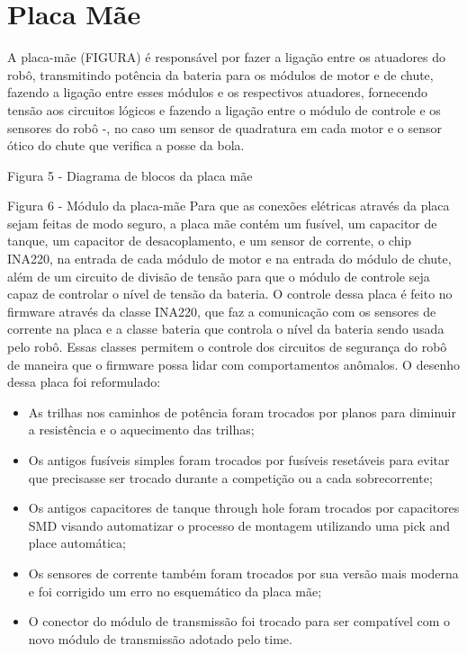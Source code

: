 \section{Placa Mãe}\label{sec:placa_mae}

A placa-mãe (FIGURA) é responsável por fazer a ligação entre os atuadores do robô, transmitindo potência da bateria para os módulos de motor e de chute, fazendo a ligação entre esses módulos e os respectivos atuadores, fornecendo tensão aos circuitos lógicos e fazendo a ligação entre o módulo de controle e os sensores do robô -, no caso um sensor de quadratura em cada motor e o sensor ótico do chute que verifica a posse da bola. 

Figura 5 - Diagrama de blocos da placa mãe

Figura 6 - Módulo da placa-mãe
Para que as conexões elétricas através da placa sejam feitas de modo seguro, a placa mãe contém um fusível, um capacitor de tanque, um capacitor de desacoplamento, e um sensor de corrente, o chip INA220, na entrada de cada módulo de motor e na entrada do módulo de chute, além de um circuito de divisão de tensão para que o módulo de controle seja capaz de controlar o nível de tensão da bateria.
O controle dessa placa é feito no firmware através da classe INA220, que faz a comunicação com os sensores de corrente na placa e a classe bateria que controla o nível da bateria sendo usada pelo robô. Essas classes permitem o controle dos circuitos de segurança do robô de maneira que o firmware possa lidar com comportamentos anômalos.
O desenho dessa placa foi reformulado:

\begin{itemize}
  \item As trilhas nos caminhos de potência foram trocados por planos para diminuir a resistência e o aquecimento das trilhas;
  \item Os antigos fusíveis simples foram trocados por fusíveis resetáveis para evitar que precisasse ser trocado durante a competição ou a 		cada sobrecorrente;
  \item Os antigos capacitores de tanque through hole foram trocados por capacitores SMD visando automatizar o processo de montagem utilizando 			uma pick and place automática;
  \item Os sensores de corrente também foram trocados por sua versão mais moderna e foi corrigido um erro no esquemático da placa mãe;
  \item O conector do módulo de transmissão foi trocado para ser compatível com o novo módulo de transmissão adotado pelo time.
\end{itemize}

